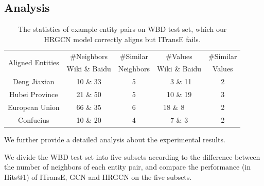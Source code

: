 	
	\subsection{Analysis}
	

	\begin{table}
	\centering
	\small
	\begin{tabular}{ccccc}
		\toprule
		\multirow{2}{*}{Aligned Entities} & \#Neighbors & \#Similar & \#Values & \#Similar \\
		& Wiki \& Baidu & Neighbors & Wiki \& Baidu & Values \\
		\midrule
		Deng Jiaxian & 10 \& 33 & 5 & \ 3 \& 11 & 2\\
		Hubei Province & 21 \& 50 & 5 & 10 \& 19 & 3\\
		European Union & 66 \& 35 & 6 & 18 \& 8\ \ \ & 2\\
		Confucius & 10 \& 20 & 4 & 7 \& 3 & 2\\
		\bottomrule
	\end{tabular}
	\caption{The statistics of example entity pairs on WBD test set, which our HRGCN model correctly aligns but ITransE fails.}
	\label{example}
\end{table}
	
	We further provide a detailed analysis about the experimental results.
	
	We divide the WBD test set into five subsets according to the difference between the number of neighbors of each entity pair, and compare the performance (in Hits@1) of ITransE, GCN and HRGCN on the five subsets.
	
